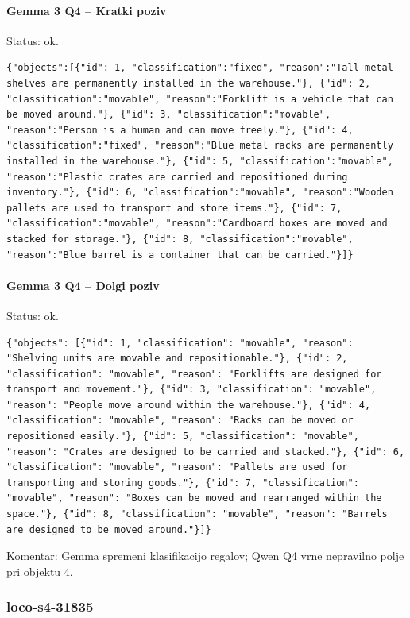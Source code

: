 \paragraph{Gemma 3 Q4 -- Kratki poziv}
Status: ok. 
\begin{lstlisting}
{"objects":[{"id": 1, "classification":"fixed", "reason":"Tall metal shelves are permanently installed in the warehouse."}, {"id": 2, "classification":"movable", "reason":"Forklift is a vehicle that can be moved around."}, {"id": 3, "classification":"movable", "reason":"Person is a human and can move freely."}, {"id": 4, "classification":"fixed", "reason":"Blue metal racks are permanently installed in the warehouse."}, {"id": 5, "classification":"movable", "reason":"Plastic crates are carried and repositioned during inventory."}, {"id": 6, "classification":"movable", "reason":"Wooden pallets are used to transport and store items."}, {"id": 7, "classification":"movable", "reason":"Cardboard boxes are moved and stacked for storage."}, {"id": 8, "classification":"movable", "reason":"Blue barrel is a container that can be carried."}]}
\end{lstlisting}
\paragraph{Gemma 3 Q4 -- Dolgi poziv}
Status: ok. 
\begin{lstlisting}
{"objects": [{"id": 1, "classification": "movable", "reason": "Shelving units are movable and repositionable."}, {"id": 2, "classification": "movable", "reason": "Forklifts are designed for transport and movement."}, {"id": 3, "classification": "movable", "reason": "People move around within the warehouse."}, {"id": 4, "classification": "movable", "reason": "Racks can be moved or repositioned easily."}, {"id": 5, "classification": "movable", "reason": "Crates are designed to be carried and stacked."}, {"id": 6, "classification": "movable", "reason": "Pallets are used for transporting and storing goods."}, {"id": 7, "classification": "movable", "reason": "Boxes can be moved and rearranged within the space."}, {"id": 8, "classification": "movable", "reason": "Barrels are designed to be moved around."}]}
\end{lstlisting}
Komentar: Gemma spremeni klasifikacijo regalov; Qwen Q4 vrne nepravilno polje pri objektu 4.
\subsubsection{loco-s4-31835}
